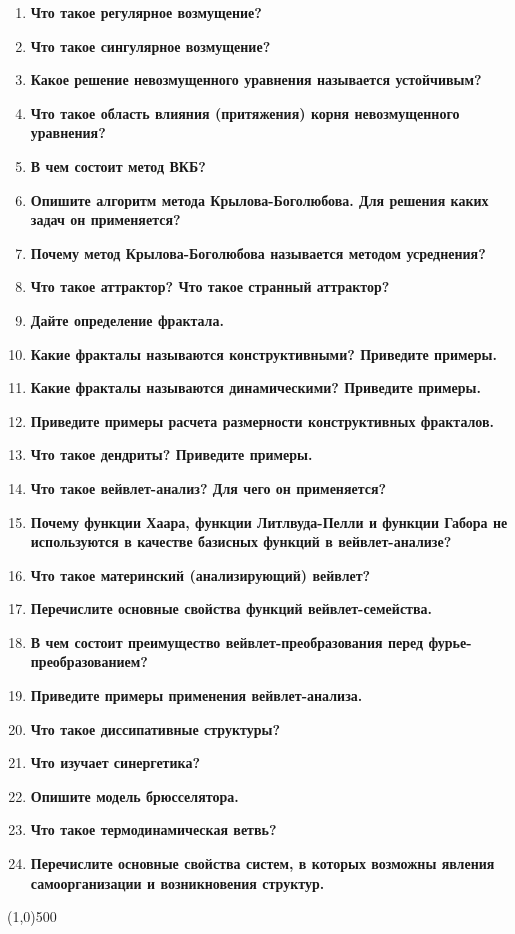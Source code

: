 \begin{enumerate}[label=\textbf{\underline{\arabic*.}}]
\item \textbf{Что такое регулярное возмущение?}
\item \textbf{Что такое сингулярное возмущение?}
\item \textbf{Какое решение невозмущенного уравнения называется устойчивым?}
\item \textbf{Что такое область влияния (притяжения) корня невозмущенного уравнения?}
\item \textbf{В чем состоит метод ВКБ?}
\item \textbf{Опишите алгоритм метода Крылова-Боголюбова. Для решения каких задач он применяется?}
\item \textbf{Почему метод Крылова-Боголюбова называется методом усреднения?}
\item \textbf{Что такое аттрактор? Что такое странный аттрактор?}
\item \textbf{Дайте определение фрактала.}
\item \textbf{Какие фракталы называются конструктивными? Приведите примеры.}
\item \textbf{Какие фракталы называются динамическими? Приведите примеры.}
\item \textbf{Приведите примеры расчета размерности конструктивных фракталов.}
\item \textbf{Что такое дендриты? Приведите примеры.}
\item \textbf{Что такое вейвлет-анализ? Для чего он применяется?}
\item \textbf{Почему функции Хаара, функции Литлвуда-Пелли и функции Габора не используются в качестве базисных функций в вейвлет-анализе?}
\item \textbf{Что такое материнский (анализирующий) вейвлет?}
\item \textbf{Перечислите основные свойства функций вейвлет-семейства.}
\item \textbf{В чем состоит преимущество вейвлет-преобразования перед фурье-преобразованием?}
\item \textbf{Приведите примеры применения вейвлет-анализа.}
\item \textbf{Что такое диссипативные структуры?}
\item \textbf{Что изучает синергетика?}
\item \textbf{Опишите модель брюсселятора.}
\item \textbf{Что такое термодинамическая ветвь?}
\item \textbf{Перечислите основные свойства систем, в которых возможны явления самоорганизации и возникновения структур.}
\end{enumerate}
\vfill\line(1,0){500}

